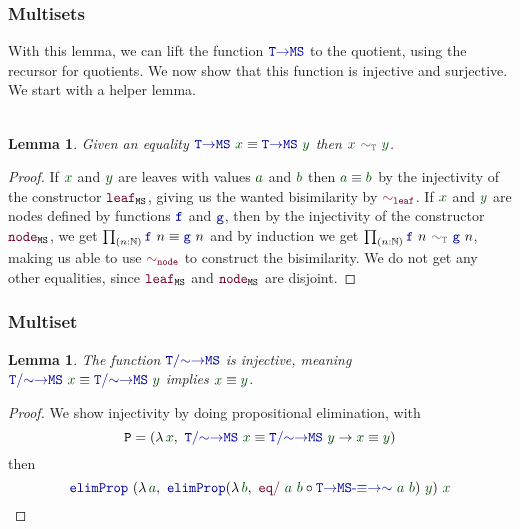 \documentclass[xelatex,mathserif,serif,notheorems]{beamer} %
\theoremstyle{plain} %
\newtheorem{lem}[thm]{Lemma}
\theoremstyle{definition}
\theoremstyle{remark}
\newcommand*{\term}[1]{\textcolor{green!30!black}{#1}} %
\newcommand*{\relation}[1]{\textcolor{gray!75!black}{\ensuremath{\mathtt{#1}}}}
\newcommand*{\function}[1]{\textcolor{blue!60!black}{\ensuremath{\mathtt{#1}}}}
\newcommand*{\constructor}[1]{\textcolor{purple!60!black}{\ensuremath{\mathtt{#1}}}}
\newcommand*{\typeformer}[1]{\ensuremath{\mathtt{#1}}}
\newcommand{\setlengths}{
  \setlength{\abovedisplayskip}{4pt}
  \setlength{\belowdisplayskip}{4pt}
  \setlength{\abovedisplayshortskip}{2pt}
  \setlength{\belowdisplayshortskip}{2pt}
}
\begin{document}
\begin{frame}
  \frametitle{Multisets}
  With this lemma, we can lift the function \(\function{T{\rightarrow}MS}\) to the quotient, using the recursor for quotients. We now show that this function is injective and surjective. We start with a helper lemma.
  \\ \\
  \begin{lem}
    Given an equality \(\function{T{\rightarrow}MS}~\term{x} \equiv \function{T{\rightarrow}MS}~\term{y}\) then \(\term{x}~\relation{\sim_{T}}~\term{y}\).
  \end{lem}
  \begin{proof}
    If \(\term{x}\) and \(\term{y}\) are leaves with values \(\term{a}\) and \(\term{b}\) then \(\term{a} \equiv \term{b}\) by the injectivity of the constructor \(\constructor{leaf}_{\typeformer{MS}}\), giving us the wanted bisimilarity by \(\constructor{\sim_{leaf}}\). If \(\term{x}\) and \(\term{y}\) are nodes defined by functions \(\function{f}\) and \(\function{g}\), then by the injectivity of the constructor \(\constructor{node}_{\typeformer{MS}}\), we get \(\prod_{(n : \mathbb{N})} \function{f}~n \equiv \function{g}~n\) and by induction we get \(\prod_{(n : \mathbb{N})} \function{f}~n~\relation{\sim_{T}}~\function{g}~n\), making us able to use \(\constructor{\sim_{node}}\) to construct the bisimilarity. We do not get any other equalities, since \(\constructor{leaf}_{\typeformer{MS}}\) and \(\constructor{node}_{\typeformer{MS}}\) are disjoint.
  \end{proof}
\end{frame}

\begin{frame}
  \frametitle{Multiset}
  \begin{lem}
    The function \(\function{T/{\sim}{\rightarrow}MS}\) is injective, meaning \\
    \(\function{T/{\sim}{\rightarrow}MS}~\term{x} \equiv \function{T/{\sim}{\rightarrow}MS}~\term{y}\) implies \(\term{x} \equiv \term{y}\).
  \end{lem}\setlengths
  \begin{proof}
    We show injectivity by doing propositional elimination, with
    \begin{equation}
      \typeformer{P} = (\lambda\,\term{x},~\function{T/{\sim}{\rightarrow}MS}~\term{x} \equiv \function{T/{\sim}{\rightarrow}MS}~\term{y} \rightarrow \term{x} \equiv \term{y})
    \end{equation}
    then
    \begin{equation}
      \function{elimProp}~(\lambda\,\term{a},~\function{elimProp} (\lambda\,\term{b},~\constructor{eq/}~\term{a}~\term{b} \circ \function{T{\rightarrow}MS\text{-}{\equiv}{\rightarrow}{\sim}}~\term{a}~\term{b})~\term{y})~\term{x}
    \end{equation}
  \end{proof}
\end{frame}
\end{document}
